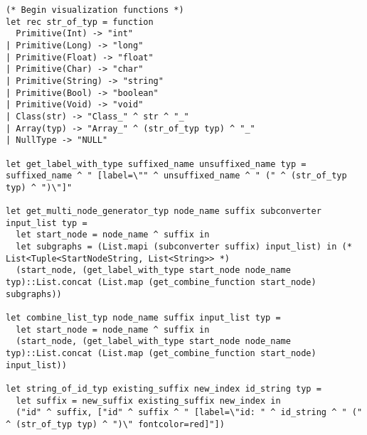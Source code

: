 \documentclass{article}
\begin{document}
\begin{verbatim}
(* Begin visualization functions *)
let rec str_of_typ = function
  Primitive(Int) -> "int"
| Primitive(Long) -> "long"
| Primitive(Float) -> "float"
| Primitive(Char) -> "char"
| Primitive(String) -> "string"
| Primitive(Bool) -> "boolean"
| Primitive(Void) -> "void"
| Class(str) -> "Class_" ^ str ^ "_"
| Array(typ) -> "Array_" ^ (str_of_typ typ) ^ "_"
| NullType -> "NULL"

let get_label_with_type suffixed_name unsuffixed_name typ = suffixed_name ^ " [label=\"" ^ unsuffixed_name ^ " (" ^ (str_of_typ typ) ^ ")\"]"

let get_multi_node_generator_typ node_name suffix subconverter input_list typ =
  let start_node = node_name ^ suffix in
  let subgraphs = (List.mapi (subconverter suffix) input_list) in (* List<Tuple<StartNodeString, List<String>> *)
  (start_node, (get_label_with_type start_node node_name typ)::List.concat (List.map (get_combine_function start_node) subgraphs))

let combine_list_typ node_name suffix input_list typ =
  let start_node = node_name ^ suffix in
  (start_node, (get_label_with_type start_node node_name typ)::List.concat (List.map (get_combine_function start_node) input_list))

let string_of_id_typ existing_suffix new_index id_string typ =
  let suffix = new_suffix existing_suffix new_index in
  ("id" ^ suffix, ["id" ^ suffix ^ " [label=\"id: " ^ id_string ^ " (" ^ (str_of_typ typ) ^ ")\" fontcolor=red]"])


\end{verbatim}
\end{document}
